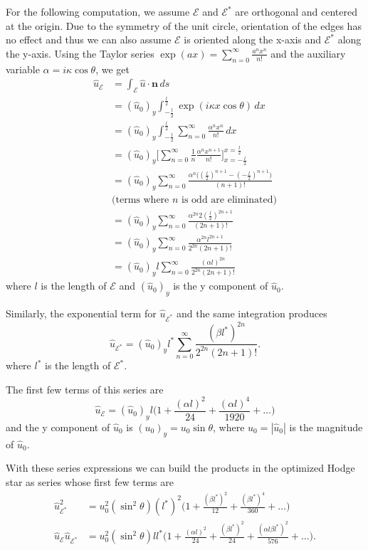 \documentclass[utf8,english]{gradu3}
\begin{document}
For the following computation, we assume $\mathcal{E}$ and $\mathcal{E}^*$
are orthogonal and centered at the origin.
Due to the symmetry of the unit circle, orientation of the edges has no effect
and thus we can also assume $\mathcal{E}$ is oriented along the x-axis
and $\mathcal{E}^*$ along the y-axis.
Using the Taylor series $\exp(ax) = \sum_{n=0}^{\infty} \frac{a^nx^n}{n!}$
and the auxiliary variable $\alpha = i\kappa\cos\theta$, we get
\begin{align*}
\hat{u}_{\mathcal{E}} &= \int_{\mathcal{E}} \hat{u} \cdot \mathbf{n} \,ds \\
&= (\hat{u}_0)_y \int_{-\frac{l}{2}}^{\frac{l}{2}} \exp(i \kappa x \cos\theta) \,dx \\
&= (\hat{u}_0)_y \int_{-\frac{l}{2}}^{\frac{l}{2}} \sum_{n=0}^{\infty} \frac{\alpha^n x^n}{n!} \,dx \\
&= (\hat{u}_0)_y \Big[ \sum_{n=0}^{\infty} \frac{1}{n}\frac{\alpha^n x^{n+1}}{n!} \Big]_{x = -\frac{l}{2}}^{x = \frac{l}{2}} \\
&= (\hat{u}_0)_y \sum_{n=0}^{\infty} \frac{\alpha^n \Big( (\frac{l}{2})^{n+1} - (-\frac{l}{2})^{n+1} \Big)}{(n + 1)!} \\
&\text{(terms where $n$ is odd are eliminated)} \\
&= (\hat{u}_0)_y \sum_{n=0}^{\infty} \frac{\alpha^{2n} 2(\frac{l}{2})^{2n+1}}{(2n + 1)!} \\
&= (\hat{u}_0)_y \sum_{n=0}^{\infty} \frac{\alpha^{2n} l^{2n+1}}{2^{2n}(2n + 1)!} \\
&= (\hat{u}_0)_y l \sum_{n=0}^{\infty} \frac{(\alpha l)^{2n}}{2^{2n}(2n + 1)!}
\end{align*}
where $l$ is the length of $\mathcal{E}$
and $(\hat{u}_0)_y$ is the y component of $\hat{u}_0$.

Similarly, the exponential term for $\hat{u}_{\mathcal{E}^*}$
and the same integration produces
\[
  \hat{u}_{\mathcal{E}^*} = (\hat{u}_0)_y l^* \sum_{n=0}^{\infty} \frac{(\beta l^*)^{2n}}{2^{2n}(2n + 1)!}. 
\]
where $l^*$ is the length of $\mathcal{E}^*$.

The first few terms of this series are
\[
  \hat{u}_{\mathcal{E}} = (\hat{u}_0)_y l
  \Big( 1 + \frac{(\alpha l)^2}{24} + \frac{(\alpha l)^4}{1920} + \dots \Big)
\]
and the y component of $\hat{u}_0$ is $(u_0)_y = u_0\sin\theta$,
where $u_0 = |\hat{u}_0|$ is the magnitude of $\hat{u}_0$.

With these series expressions we can build the products
in the optimized Hodge star as series
whose first few terms are
\begin{align*}
\hat{u}_{\mathcal{E}^*}^2 &= u_0^2 (\sin^2\theta) (l^*)^2
\Big( 1 + \frac{(\beta l^*)^2}{12} + \frac{(\beta l^*)^4}{360} + \dots \Big) \\
\hat{u}_{\mathcal{E}} \hat{u}_{\mathcal{E}^*} &= u_0^2 (\sin^2\theta) ll^*
\Big( 1 + \frac{(\alpha l)^2}{24} + \frac{(\beta l^*)^2}{24}
+ \frac{(\alpha l \beta l^*)^2}{576} + \dots \Big).
\end{align*}
\end{document}
